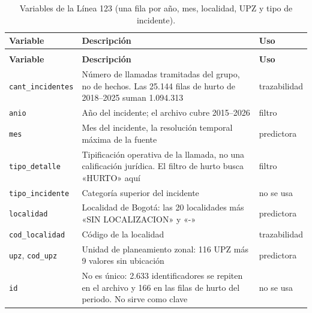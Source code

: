 {\begin{longtable}{@{}>{\raggedright\arraybackslash}p{4.2cm}>{\raggedright\arraybackslash}p{8.6cm}>{\raggedright\arraybackslash}p{2.2cm}@{}}
\caption{Variables de la Línea 123 (una fila por año, mes, localidad, UPZ y tipo de incidente).}\label{tab:dic-linea123}\\
\toprule
\textbf{Variable} & \textbf{Descripción} & \textbf{Uso} \\
\midrule
\endfirsthead
\multicolumn{3}{@{}l}{\emph{Tabla~\ref{tab:dic-linea123} (continuación)}}\\
\toprule
\textbf{Variable} & \textbf{Descripción} & \textbf{Uso} \\
\midrule
\endhead
\texttt{cant\_\allowbreak{}incidentes} & Número de llamadas tramitadas del grupo, no de hechos. Las 25.144 filas de hurto de 2018--2025 suman 1.094.313 & trazabilidad \\
\texttt{anio} & Año del incidente; el archivo cubre 2015--2026 & filtro \\
\texttt{mes} & Mes del incidente, la resolución temporal máxima de la fuente & predictora \\
\texttt{tipo\_\allowbreak{}detalle} & Tipificación operativa de la llamada, no una calificación jurídica. El filtro de hurto busca «HURTO» aquí & filtro \\
\texttt{tipo\_\allowbreak{}incidente} & Categoría superior del incidente & no se usa \\
\texttt{localidad} & Localidad de Bogotá: las 20 localidades más «SIN LOCALIZACION» y «-» & predictora \\
\texttt{cod\_\allowbreak{}localidad} & Código de la localidad & trazabilidad \\
\texttt{upz}, \texttt{cod\_\allowbreak{}upz} & Unidad de planeamiento zonal: 116 UPZ más 9 valores sin ubicación & predictora \\
\texttt{id} & No es único: 2.633 identificadores se repiten en el archivo y 166 en las filas de hurto del periodo. No sirve como clave & no se usa \\
\bottomrule
\end{longtable}

}
